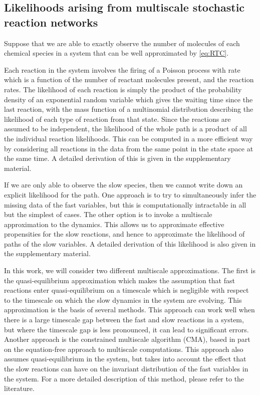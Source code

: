 \documentclass[final]{siamltex}
\newcommand{\edit}[1]{{\color{red} #1}}
\begin{document}
\subsection{Likelihoods arising from multiscale stochastic reaction networks}
Suppose that we are able to exactly observe the number of molecules of
each chemical species in a system that can be well approximated by
\eqref{eq:RTC}. \edit{Each reaction in the system involves the firing
  of a Poisson process with rate which is a function of the number of
  reactant molecules present, and the reaction rates. The likelihood
  of each reaction is simply the product of the probability density of
  an exponential random
  variable which gives the waiting time since the last reaction, with
  the mass function of a
  multinomial distribution describing the likelihood of each type of
  reaction from that state. Since the
  reactions are assumed to be independent, the likelihood of the whole
  path is a product of all the individual reaction likelihoods. This
  can be computed in a more efficient way by considering all reactions
  in the data from the same point in the state space at the same
  time. A detailed derivation of this is given in the
  supplementary material.

If we are only able to observe the slow species, then we cannot write
down an explicit likelihood for the path. One approach is to try to
simultaneously infer the
missing data of the fast variables, but this is computationally
intractable in all but the simplest of cases. The other option is to
invoke a multiscale approximation to the dynamics. This allows us to
approximate effective propensities for the slow reactions, and hence
to approximate the likelihood of paths of the slow variables. A
detailed derivation of this likelihood is also given in the
supplementary material.

In this work, we will consider two different multiscale
approximations. The first is the quasi-equilibrium approximation
which makes the assumption that fast reactions
enter quasi-equilibrium on a timescale which is negligible with
respect to the timescale on which the slow dynamics in the system are
evolving. This approximation is the basis of several
methods\cite{weinan2007nested,cao2005slow}. This approach can work well when there is a large timescale gap
between the fast and slow reactions in a system, but where the
timescale gap is less pronounced, it can lead to significant
errors\cite{cotter2016error}. Another approach is the
constrained multiscale algorithm (CMA)\cite{cotter2011constrained,cotter2016constrained}, based in part on the
equation-free approach to multiscale computations\cite{kevrekidis2003equation,erban2006gene}. This approach also assumes quasi-equilibrium in the
system, but takes into account the effect that the slow reactions can
have on the invariant distribution of the fast variables in the
system. For a more detailed description of this method, please refer
to the literature\cite{cotter2016constrained}.


}
\end{document}
